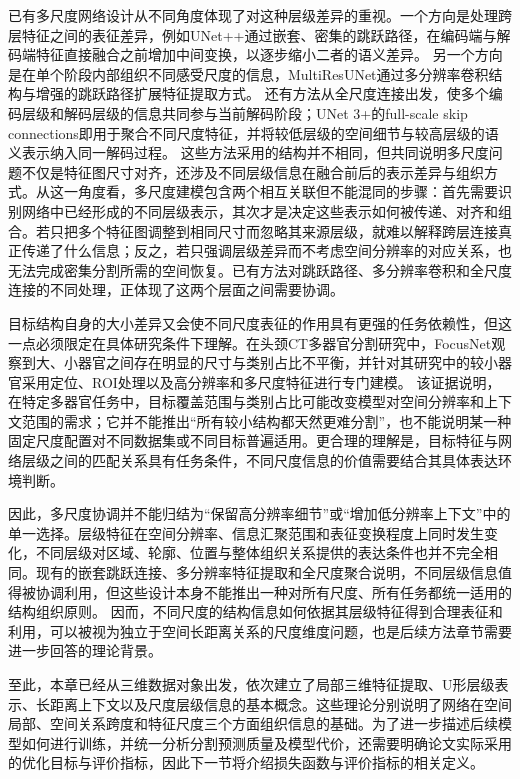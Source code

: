 已有多尺度网络设计从不同角度体现了对这种层级差异的重视。一个方向是处理跨层特征之间的表征差异，例如UNet++通过嵌套、密集的跳跃路径，在编码端与解码端特征直接融合之前增加中间变换，以逐步缩小二者的语义差异。\cite{zhou2018unetpp} 另一个方向是在单个阶段内部组织不同感受尺度的信息，MultiResUNet通过多分辨率卷积结构与增强的跳跃路径扩展特征提取方式。\cite{ibtehaz2020multiresunet} 还有方法从全尺度连接出发，使多个编码层级和解码层级的信息共同参与当前解码阶段；UNet 3+的full-scale skip connections即用于聚合不同尺度特征，并将较低层级的空间细节与较高层级的语义表示纳入同一解码过程。\cite{huang2020unet3plus} 这些方法采用的结构并不相同，但共同说明多尺度问题不仅是特征图尺寸对齐，还涉及不同层级信息在融合前后的表示差异与组织方式。从这一角度看，多尺度建模包含两个相互关联但不能混同的步骤：首先需要识别网络中已经形成的不同层级表示，其次才是决定这些表示如何被传递、对齐和组合。若只把多个特征图调整到相同尺寸而忽略其来源层级，就难以解释跨层连接真正传递了什么信息；反之，若只强调层级差异而不考虑空间分辨率的对应关系，也无法完成密集分割所需的空间恢复。已有方法对跳跃路径、多分辨率卷积和全尺度连接的不同处理，正体现了这两个层面之间需要协调。

目标结构自身的大小差异又会使不同尺度表征的作用具有更强的任务依赖性，但这一点必须限定在具体研究条件下理解。在头颈CT多器官分割研究中，FocusNet观察到大、小器官之间存在明显的尺寸与类别占比不平衡，并针对其研究中的较小器官采用定位、ROI处理以及高分辨率和多尺度特征进行专门建模。\cite{gao2019focusnet} 该证据说明，在特定多器官任务中，目标覆盖范围与类别占比可能改变模型对空间分辨率和上下文范围的需求；它并不能推出“所有较小结构都天然更难分割”，也不能说明某一种固定尺度配置对不同数据集或不同目标普遍适用。更合理的理解是，目标特征与网络层级之间的匹配关系具有任务条件，不同尺度信息的价值需要结合其具体表达环境判断。

因此，多尺度协调并不能归结为“保留高分辨率细节”或“增加低分辨率上下文”中的单一选择。层级特征在空间分辨率、信息汇聚范围和表征变换程度上同时发生变化，不同层级对区域、轮廓、位置与整体组织关系提供的表达条件也并不完全相同。现有的嵌套跳跃连接、多分辨率特征提取和全尺度聚合说明，不同层级信息值得被协调利用，但这些设计本身不能推出一种对所有尺度、所有任务都统一适用的结构组织原则。\cite{zhou2018unetpp,huang2020unet3plus} 因而，不同尺度的结构信息如何依据其层级特征得到合理表征和利用，可以被视为独立于空间长距离关系的尺度维度问题，也是后续方法章节需要进一步回答的理论背景。

至此，本章已经从三维数据对象出发，依次建立了局部三维特征提取、U形层级表示、长距离上下文以及尺度层级信息的基本概念。这些理论分别说明了网络在空间局部、空间关系跨度和特征尺度三个方面组织信息的基础。为了进一步描述后续模型如何进行训练，并统一分析分割预测质量及模型代价，还需要明确论文实际采用的优化目标与评价指标，因此下一节将介绍损失函数与评价指标的相关定义。

